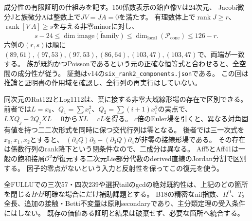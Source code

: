 \documentclass[a4paper,11pt]{ltjsarticle}
\theoremstyle{definition}
\newcommand{\rank}{\operatorname{rank}}
\begin{document}
成分性の有限証明の仕組みを記す。150係数表示の鉛直像Vは24次元、
Jacobi微分Jと族微分Aは整数上で$JV=JA=0$を満たす。
有理数体上で$\rank J\ge r$、$\rank[V\ A]\ge s$を与える非零minorに対し、
\[
 s-24\le\dim\overline{\mathrm{image}(\mathrm{family})}
 \le\dim_{\mathrm{local}}(\mathcal P_{\mathrm{cone}})\le126-r.
\]
六例の$(r,s)$は順に$(89,61),(97,53),(97,53),(86,64),(103,47),(103,47)$で、両端が一致する。
族が既約かつPoissonであるという元の正確な恒等式と合わせると、全空間の成分性が従う。
証拠はv14の\texttt{six\_rank2\_components.json}である。
この回は推論と証明書の作用域を確認し、全行列の再実行はしていない。

同次元のRat122とLog1112は、葉に接する非零大域線形場の存在で区別できる。
前者では$L=x_0$、$Q_1=\sum x_i^2$、$Q_2=\sum(i+1)x_i^2$の実点で、
$L XQ_j-2Q_jXL=0$から$XL=cL$を得る。
$c$倍のEuler場を引くと、異なる対角固有値を持つ二二次形式を同時に保つ交代行列は零となる。
後者では三一次式を$x_0,x_1,x_2$とすると、
$(\partial_4Q)\partial_3-(\partial_3Q)\partial_4$が非零の接線形場である。
その存在は係数行列のrank降下という閉条件なので、二成分は異なる。
Aff5とAff41は一般の飽和接層$\mathcal O^2$が復元する二次元Lie部分代数のderived直線のJordan分割で区別する。
因子的零点がないという入力と反射性を保ってこの復元を使う。

全FULLUでの三次57・四次239や選択tailのgcdの絶対既約性は、上記のどの箇所を閉じるかが明確な場合にだけ補助課題とする。
B18の精密なnil指数、\(H^0\)、\(T_2\)全長、追加の接触・Betti不変量は原則secondaryであり、主分類定理の受入条件にはしない。
既存の価値ある証明と結果は破棄せず、必要な箇所へ統合する。
\end{document}
